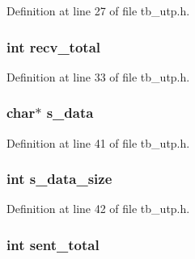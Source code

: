 Definition at line 27 of file tb\-\_\-utp.\-h.

\hypertarget{structtb__utp__t_abf192d5591e28d37f0795a6c730a9a5b}{
\subsubsection[{recv\-\_\-total}]{\setlength{\rightskip}{0pt plus 5cm}int recv\-\_\-total}}\label{structtb__utp__t_abf192d5591e28d37f0795a6c730a9a5b}


Definition at line 33 of file tb\-\_\-utp.\-h.

\hypertarget{structtb__utp__t_acf38f384acf7d5603daf8ddcd2a71a25}{
\subsubsection[{s\-\_\-data}]{\setlength{\rightskip}{0pt plus 5cm}char$\ast$ s\-\_\-data}}\label{structtb__utp__t_acf38f384acf7d5603daf8ddcd2a71a25}


Definition at line 41 of file tb\-\_\-utp.\-h.

\hypertarget{structtb__utp__t_a9572e5f95cdcd648c1973020b5f4a25b}{
\subsubsection[{s\-\_\-data\-\_\-size}]{\setlength{\rightskip}{0pt plus 5cm}int s\-\_\-data\-\_\-size}}\label{structtb__utp__t_a9572e5f95cdcd648c1973020b5f4a25b}


Definition at line 42 of file tb\-\_\-utp.\-h.

\hypertarget{structtb__utp__t_a8cb5bfce3dd82afd8155aae9c7328441}{
\subsubsection[{sent\-\_\-total}]{\setlength{\rightskip}{0pt plus 5cm}int sent\-\_\-total}}\label{structtb__utp__t_a8cb5bfce3dd82afd8155aae9c7328441}


